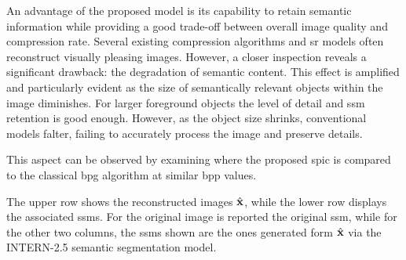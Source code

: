 An advantage of the proposed model is its capability to retain semantic information while providing a good trade-off between overall image quality and compression rate. Several existing compression algorithms and \gls{sr} models often reconstruct visually pleasing images. However, a closer inspection reveals a significant drawback: the degradation of semantic content. This effect is amplified and particularly evident as the size of semantically relevant objects within the image diminishes. For larger foreground objects the level of detail and \gls{ssm} retention is good enough. However, as the object size shrinks, conventional models falter, failing to accurately process the image and preserve details.

This aspect can be observed by examining  where the proposed \gls{spic} is compared to the classical \gls{bpg} algorithm at similar \gls{bpp} values.

The upper row shows the reconstructed images $\hat{\mathbf{x}}$, while the lower row displays the associated \glspl{ssm}. For the original image is reported the original \gls{ssm}, while for the other two columns, the \glspl{ssm} shown are the ones generated form $\hat{\mathbf{x}}$ via the INTERN-2.5 semantic segmentation model.

